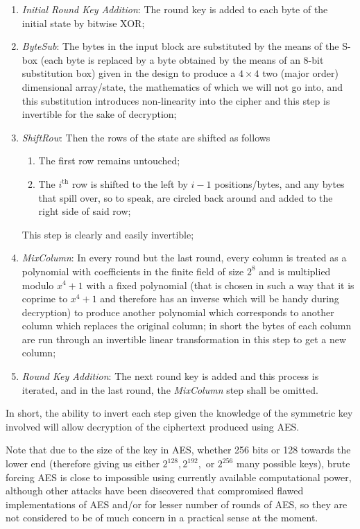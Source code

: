 \begin{enumerate}
    \setlength\itemsep{1em}
    \item \emph{Initial Round Key Addition}: The round key is added to each byte of the initial state by bitwise XOR;
    \item \emph{ByteSub}: The bytes in the input block are substituted by the means of the S-box (each byte is replaced by a byte obtained by the means of an $8$-bit substitution box) given in the design to produce a $4\times 4$ two (major order) dimensional array/state, the mathematics of which we will not go into, and this substitution introduces non-linearity into the cipher and this step is invertible for the sake of decryption;
    \item \emph{ShiftRow}: Then the rows of the state are shifted as follows

    \begin{enumerate}
        \item The first row remains untouched;
        \item The $i^\text{th}$ row is shifted to the left by $i-1$ positions/bytes, and any bytes that spill over, so to speak, are circled back around and added to the right side of said row;
    \end{enumerate}

    This step is clearly and easily invertible;
\item \emph{MixColumn}: In every round but the last round, every column is treated as a polynomial with coefficients in the finite field of size $2^8$ and is multiplied modulo $x^4+1$ with a fixed polynomial (that is chosen in such a way that it is coprime to $x^4+1$ and therefore has an inverse which will be handy during decryption) to produce another polynomial which corresponds to another column which replaces the original column; 
    in short the bytes of each column are run through an invertible linear transformation in this step to get a new column;
\item \emph{Round Key Addition}: The next round key is added and this process is iterated, and in the last round, the \emph{MixColumn} step shall be omitted.
\end{enumerate}

In short, the ability to invert each step given the knowledge of the symmetric key involved will allow decryption of the ciphertext produced using AES.

Note that due to the size of the key in AES, whether 256 bits or 128 towards the lower end (therefore giving us either $2^{128}, 2^{192},$ or $2^{256}$ many possible keys), brute forcing AES is close to impossible using currently available computational power, although other attacks have been discovered that compromised flawed implementations of AES and/or for lesser number of rounds of AES, so they are not considered to be of much concern in a practical sense at the moment.

